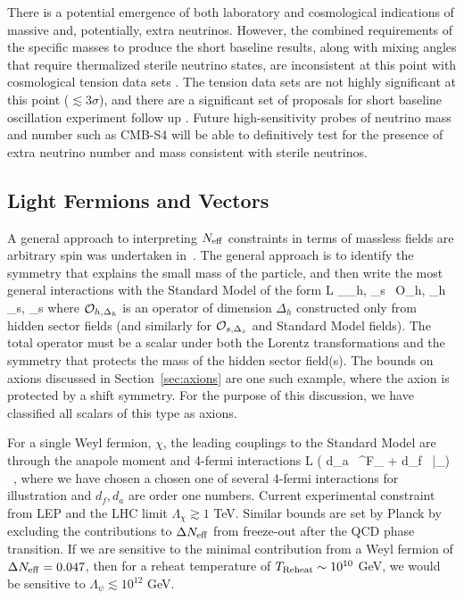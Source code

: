 There is a potential emergence of both laboratory and cosmological
indications of massive and, potentially, extra neutrinos. However, the
combined requirements of the specific masses to produce the short
baseline results, along with mixing angles that require thermalized
sterile neutrino states, are inconsistent at this point with
cosmological tension data sets
\cite{Joudaki:2012uk,Archidiacono:2013xxa}. The tension data sets are
not highly significant at this point ($\lesssim 3\sigma$), and there
are a significant set of proposals for short baseline oscillation
experiment follow up \cite{Abazajian:2012ys}. Future high-sensitivity
probes of neutrino mass and number such as CMB-S4 will be able to
definitively test for the presence of extra neutrino number and mass
consistent with sterile neutrinos.


\subsection{Light Fermions and Vectors}

A general approach to interpreting $N_{\rm eff}$ constraints in terms of massless fields are arbitrary spin was undertaken in~\cite{Brust:2013xpv}.  The general approach is to identify the symmetry that explains the small mass of the particle, and then write the most general interactions with the Standard Model of the form
\beq
{\cal L} \supset \sum_{\Delta_h, \Delta_s}  \,  {\cal O}_{h, \Delta_h} _{s, \Delta_s}
\eeq
where ${\cal O}_{h,\Delta_h}$ is an operator of dimension $\Delta_h$ constructed only from hidden sector fields (and similarly for ${\cal O}_{s, \Delta_s}$ and Standard Model fields).  The total operator must be a scalar under both the Lorentz transformations and the symmetry that protects the mass of the hidden sector field(s).  The bounds on axions discussed in Section~\ref{sec:axions} are one such example, where the axion is protected by a shift symmetry.  For the purpose of this discussion, we have classified all scalars of this type as axions.

For a single Weyl fermion, $\chi$, the leading couplings to the Standard Model are through the anapole moment and 4-fermi interactions
\beq
{\cal L} \supset {} \Big( d_a  \, \partial^\nu F_{\mu \nu} + d_f \,  \bar \psi \gamma_\mu \psi \Big) \ ,
\eeq
where we have chosen a chosen one of several 4-fermi interactions for illustration and $d_f, d_a$ are order one numbers.  Current experimental constraint from LEP and the LHC limit $\Lambda_\chi \gtrsim 1$ TeV.  Similar bounds are set by Planck by excluding the contributions to $\Delta N_{\rm eff}$ from freeze-out after the QCD phase transition.  If we are sensitive to the minimal contribution from a Weyl fermion of $\Delta N_{\rm eff} = 0.047$, then for a reheat temperature of $T_{\rm Reheat} \sim 10^{10}$ GeV, we would be sensitive to $\Lambda_\psi \lesssim 10^{12}$ GeV.

